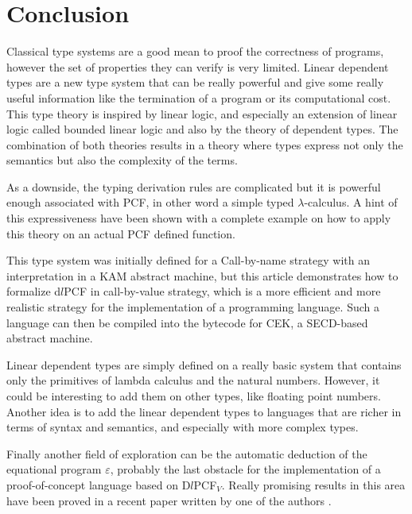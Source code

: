 \documentclass[a4paper,12pt]{article}
\begin{document}
\section{Conclusion}

Classical type systems are a good mean to proof the correctness of
programs, however the set of properties they can verify is very
limited.  Linear dependent types are a new type system that can be
really powerful and give some really useful information like the
termination of a program or its computational cost. This type theory
is inspired by linear logic, and especially an extension of linear
logic called bounded linear logic and also by the theory of dependent
types. The combination of both theories results in a theory where
types express not only the semantics but also the complexity of the
terms.

As a downside, the typing derivation rules are complicated but it is
powerful enough associated with PCF, in other word a simple typed
$\lambda$-calculus. A hint of this expressiveness have been shown with
a complete example on how to apply this theory on an actual PCF
defined function.

This type system was initially defined for a Call-by-name strategy
with an interpretation in a KAM abstract machine, but this article
demonstrates how to formalize d$l$PCF in call-by-value strategy, which
is a more efficient and more realistic strategy for the implementation
of a programming language. Such a language can then be compiled into the
bytecode for CEK, a SECD-based abstract machine.

Linear dependent types are simply defined on a really basic system
that contains only the primitives of lambda calculus and the natural
numbers. However, it could be interesting to add them on other types,
like floating point numbers. Another idea is to add the linear
dependent types to languages that are richer in terms of syntax and
semantics, and especially with more complex types.

Finally another field of exploration can be the automatic deduction
of the equational program $\varepsilon$, probably the last obstacle for 
the implementation of a proof-of-concept language
based on D$l$PCF$_{V}$. Really promising results in this area have been
proved in a recent paper written by one of the authors \cite{petit2013geometry}.




\end{document}
